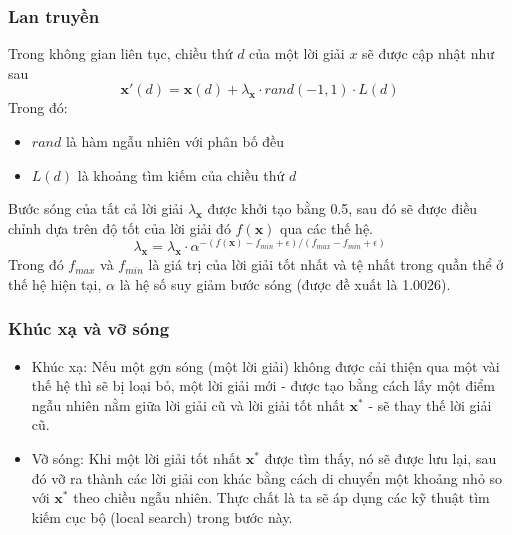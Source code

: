 \begin{frame}
    \frametitle{Lan truyền}
    \label{frame:propagation}
    Trong không gian liên tục, chiều thứ $d$ của một lời giải $x$ sẽ được cập nhật như sau
    \begin{equation}
        \label{eq:e1}
            \mathbf{x}'(d) = \mathbf{x}(d) + \lambda_\mathbf{x} \cdot rand(-1, 1) \cdot L(d)
    \end{equation}
    Trong đó:
    \begin{itemize}
        \item $rand$ là hàm ngẫu nhiên với phân bố đều
        \item $L(d)$ là khoảng tìm kiếm của chiều thứ $d$
    \end{itemize}
    Bước sóng của tất cả lời giải $\lambda_{\mathbf{x}}$ được khởi tạo bằng 0.5, sau đó sẽ được điều chỉnh dựa trên độ tốt của lời giải đó $f(\mathbf{x})$ qua các thế hệ. 
    \begin{equation}
        \label{eq:e2}
        \lambda_\mathbf{x} = \lambda_\mathbf{x}\cdot\alpha^{-(f(\mathbf{x}) - f_{min} + \epsilon)/(f_{max} - f_{min} + \epsilon)}
    \end{equation}
    Trong đó $f_{max}$ và $f_{min}$ là giá trị của lời giải tốt nhất và tệ nhất trong quần thể ở thế hệ hiện tại, $\alpha$ là hệ số suy giảm bước sóng (được đề xuất là 1.0026)\cite{zheng2019water}.
\end{frame}

\begin{frame}
    \frametitle{Khúc xạ và vỡ sóng}
    \begin{itemize}
        \item Khúc xạ: Nếu một gợn sóng (một lời giải) không được cải thiện qua một vài thế hệ thì sẽ bị loại bỏ, một lời giải mới - được tạo bằng cách lấy một điểm ngẫu nhiên nằm giữa lời giải cũ và lời giải tốt nhất $\mathbf{x^*}$ - sẽ thay thế lời giải cũ.
        \item Vỡ sóng: Khi một lời giải tốt nhất $\mathbf{x^*}$ được tìm thấy, nó sẽ được lưu lại, sau đó vỡ ra thành các lời giải con khác bằng cách di chuyển một khoảng nhỏ so với $\mathbf{x^*}$ theo chiều ngẫu nhiên. Thực chất là ta sẽ áp dụng các kỹ thuật tìm kiếm cục bộ (local search) trong bước này.
    \end{itemize}
\end{frame}